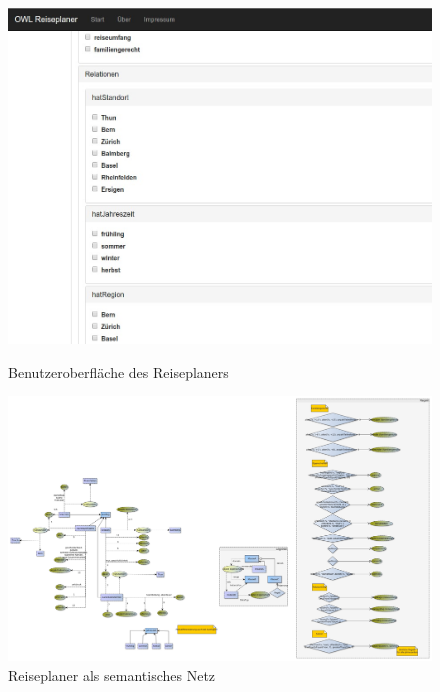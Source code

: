\documentclass[
    paper=a4,               %
    fontsize=10pt,          %
    open=right,             %
    titlepage=false,        %
    parskip=half,           %
]{scrreprt}                 %
\begin{document}
    \begin{figure}[htbp]
        \begin{minipage}[hbt]{0,49\textwidth}
            \centering
            \includegraphics[scale=0.1]{bilder/reiseplaner_gui.jpg}
            \caption*{Benutzeroberfläche des Reiseplaners}
        \end{minipage}
        \begin{minipage}[hbt]{0,49\textwidth}
            \centering
            \includegraphics[scale=0.06]{bilder/semantisches_netz.jpg}
            \caption*{Reiseplaner als semantisches Netz}
        \end{minipage}
    \end{figure}
\end{document}
